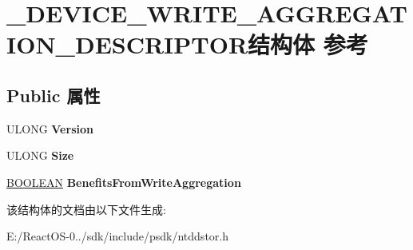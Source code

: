 \hypertarget{struct___d_e_v_i_c_e___w_r_i_t_e___a_g_g_r_e_g_a_t_i_o_n___d_e_s_c_r_i_p_t_o_r}{}\section{\+\_\+\+D\+E\+V\+I\+C\+E\+\_\+\+W\+R\+I\+T\+E\+\_\+\+A\+G\+G\+R\+E\+G\+A\+T\+I\+O\+N\+\_\+\+D\+E\+S\+C\+R\+I\+P\+T\+O\+R结构体 参考}
\label{struct___d_e_v_i_c_e___w_r_i_t_e___a_g_g_r_e_g_a_t_i_o_n___d_e_s_c_r_i_p_t_o_r}
\subsection*{Public 属性}
\begin{DoxyCompactItemize}
\item 
\mbox{\label{struct___d_e_v_i_c_e___w_r_i_t_e___a_g_g_r_e_g_a_t_i_o_n___d_e_s_c_r_i_p_t_o_r_ac8c84ca25a71d9aa51af6db37734850e}} 
U\+L\+O\+NG {\bfseries Version}
\item 
\mbox{\label{struct___d_e_v_i_c_e___w_r_i_t_e___a_g_g_r_e_g_a_t_i_o_n___d_e_s_c_r_i_p_t_o_r_a31fbe66d17835e095252f42e3c5c2b28}} 
U\+L\+O\+NG {\bfseries Size}
\item 
\mbox{\label{struct___d_e_v_i_c_e___w_r_i_t_e___a_g_g_r_e_g_a_t_i_o_n___d_e_s_c_r_i_p_t_o_r_a6a67eea0446f3683e76f8a93623909fe}} 
\hyperlink{_processor_bind_8h_a112e3146cb38b6ee95e64d85842e380a}{B\+O\+O\+L\+E\+AN} {\bfseries Benefits\+From\+Write\+Aggregation}
\end{DoxyCompactItemize}


该结构体的文档由以下文件生成\+:\begin{DoxyCompactItemize}
\item 
E\+:/\+React\+O\+S-\/0../sdk/include/psdk/ntddstor.\+h\end{DoxyCompactItemize}
